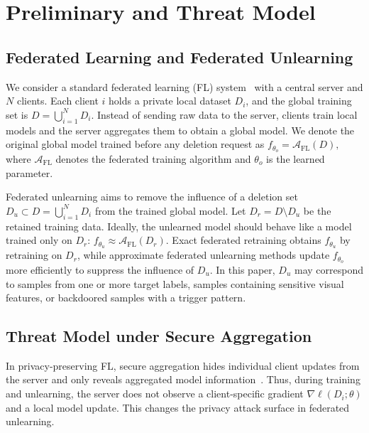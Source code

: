 \section{Preliminary and Threat Model}
\label{priliminary}


\subsection{Federated Learning and Federated Unlearning}

We consider a standard federated learning (FL) system~\citep{mcmahan2017communication,li2021sample} with a central server and $N$ clients. Each client $i$ holds a private local dataset $D_i$, and the global training set is $D=\bigcup_{i=1}^{N}D_i$. Instead of sending raw data to the server, clients train local models and the server aggregates them to obtain a global model. We denote the original global model trained before any deletion request as $f_{\theta_o} = \mathcal{A}_{\mathrm{FL}}(D),$ where $\mathcal{A}_{\mathrm{FL}}$ denotes the federated training algorithm and $\theta_o$ is the learned parameter.

Federated unlearning aims to remove the influence of a deletion set $D_u\subset  D = \bigcup_{i=1}^{N}D_i $ from the trained global model. Let $D_r=D\setminus D_u$ be the retained training data. Ideally, the unlearned model should behave like a model trained only on $D_r$: $f_{\theta_u} \approx \mathcal{A}_{\mathrm{FL}}(D_r).$ Exact federated retraining obtains $f_{\theta_u}$ by retraining on $D_r$, while approximate federated unlearning methods update $f_{\theta_o}$ more efficiently to suppress the influence of $D_u$. In this paper, $D_u$ may correspond to samples from one or more target labels, samples containing sensitive visual features, or backdoored samples with a trigger pattern.



\subsection{Threat Model under Secure Aggregation}

In privacy-preserving FL, secure aggregation hides individual client updates from the server and only reveals aggregated model information~\citep{so2023securing, bonawitz2017practical,guan2025input}. Thus, during training and unlearning, the server does not observe a client-specific gradient $\nabla \ell(D_i;\theta)$ and a local model update. This changes the privacy attack surface in federated unlearning.



